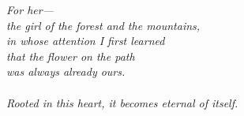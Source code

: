 \vspace{1.5em}
\begin{center}
\begin{minipage}{0.72\linewidth}
\centering\itshape\color{rose}
For her---\\[0.5em]
\upshape the girl of the forest and the mountains,\\[0.3em]
in whose attention I first learned\\[0.3em]
that the flower on the path\\[0.3em]
was always already ours.\\[0.8em]
{\footnotesize\color{gold} \\[0.2em]
Rooted in this heart, it becomes eternal of itself.}
\end{minipage}
\end{center}

\vspace{1.5em}
\goldrule
